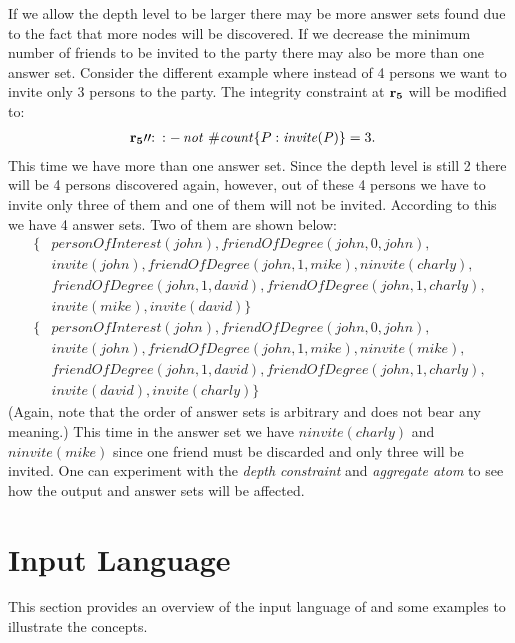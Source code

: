 \documentclass[a4paper, titlepage]{article}
\DeclareMathOperator{\leftimpl}{:-}
\DeclareMathOperator{\nott}{\mathit{not}}
\newcommand{\row}[1]{%
  \ensuremath{\color{black}\ensuremath{\mathbf{#1}} \color{black}}%
}
\newcommand{\rowprefixprimeprime}[1]{%
  \ensuremath{\color{black}\mathbf{#1\prime\prime{:}}\ }%
}
\begin{document}
If we allow the depth level to be larger there may be more 
answer sets found due to the fact that more nodes will be 
discovered. If we decrease the minimum number of friends to be 
invited to the party there may also be more than one answer set. 
Consider the different example where instead of 4 
persons we want to invite only 3 persons to the party. 
The integrity constraint at $\row{r_5}$ will be modified to:
\begin{align*}
& \rowprefixprimeprime{r_5} \leftimpl \nott \thinspace \mathit{\#count} \{ P : \mathit{invite(P)} \} = 3.
\end{align*} 
 This time we have more than one answer set. Since the depth 
 level is still 2 there will be 4 persons discovered again, 
 however, out of these 4 persons we have to invite only 
 three of them and one of them will not be invited. 
 According to this we have 4 answer sets. Two of them are 
 shown below:
\begin{align*}
   \{ &\mathit{personOfInterest(john), 
      friendOfDegree(john,0,john),}\\
      &\mathit{invite(john), friendOfDegree(john,1,mike), 
      \mathit{ninvite(charly)},}\\
      &\mathit{friendOfDegree(john,1,david), 
      friendOfDegree(john,1,charly),}\\
      &\mathit{invite(mike),invite(david)}  \} \\
   \{&\mathit{personOfInterest(john), 
   friendOfDegree(john,0,john),} \\
   &\mathit{invite(john), friendOfDegree(john,1,mike), 
   \mathit{ninvite(mike)},}\\
   &\mathit{friendOfDegree(john,1,david), 
   friendOfDegree(john,1,charly),} \\
   &\mathit{invite(david),invite(charly)}\}
 \end{align*}
(Again, note that the order of answer sets is arbitrary
and does not bear any meaning.)
%
This time in the answer set we have 
$\mathit{ninvite(charly)}$ and $\mathit{ninvite(mike)}$ 
since one friend must be discarded and only three will be 
invited. One can experiment with the \emph{depth constraint} and 
\emph{aggregate atom} to see how the output and 
answer sets will be affected.    

\section{Input Language}%
\label{sec:inputLang}
This section provides an overview of the input language of 
\dlvhex{} and some examples to illustrate the concepts. 
\end{document}
